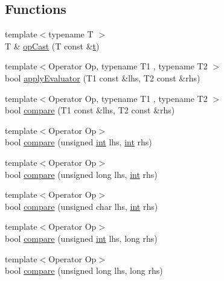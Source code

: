 \subsection*{Functions}
\begin{DoxyCompactItemize}
\item 
{\footnotesize template$<$typename T $>$ }\\T \& \hyperlink{namespace_catch_1_1_internal_adde98c1a650e94615e2b37ab0b3734e2}{op\+Cast} (T const \&\hyperlink{_s_d_l__opengl_8h_a7d65d00ca3b0630d9b5c52df855b19f5}{t})
\item 
{\footnotesize template$<$Operator Op, typename T1 , typename T2 $>$ }\\bool \hyperlink{namespace_catch_1_1_internal_a3849d993997f2b708281ff02e77dfecf}{apply\+Evaluator} (T1 const \&lhs, T2 const \&rhs)
\item 
{\footnotesize template$<$Operator Op, typename T1 , typename T2 $>$ }\\bool \hyperlink{namespace_catch_1_1_internal_a64ae04769c4583b9d4027c792b496c7d}{compare} (T1 const \&lhs, T2 const \&rhs)
\item 
{\footnotesize template$<$Operator Op$>$ }\\bool \hyperlink{namespace_catch_1_1_internal_a171aec1826898b877980a2b15fe5f735}{compare} (unsigned \hyperlink{_s_d_l__thread_8h_a6a64f9be4433e4de6e2f2f548cf3c08e}{int} lhs, \hyperlink{_s_d_l__thread_8h_a6a64f9be4433e4de6e2f2f548cf3c08e}{int} rhs)
\item 
{\footnotesize template$<$Operator Op$>$ }\\bool \hyperlink{namespace_catch_1_1_internal_aa2698c33ec87b16aff5c844165483a7a}{compare} (unsigned long lhs, \hyperlink{_s_d_l__thread_8h_a6a64f9be4433e4de6e2f2f548cf3c08e}{int} rhs)
\item 
{\footnotesize template$<$Operator Op$>$ }\\bool \hyperlink{namespace_catch_1_1_internal_ad68724393ee3d7629001a2997f6134cc}{compare} (unsigned char lhs, \hyperlink{_s_d_l__thread_8h_a6a64f9be4433e4de6e2f2f548cf3c08e}{int} rhs)
\item 
{\footnotesize template$<$Operator Op$>$ }\\bool \hyperlink{namespace_catch_1_1_internal_ac2af7b6757f9bb3539bb78acff5c4649}{compare} (unsigned \hyperlink{_s_d_l__thread_8h_a6a64f9be4433e4de6e2f2f548cf3c08e}{int} lhs, long rhs)
\item 
{\footnotesize template$<$Operator Op$>$ }\\bool \hyperlink{namespace_catch_1_1_internal_ace20062a489a8a7049fe224d62e644a7}{compare} (unsigned long lhs, long rhs)

\end{DoxyCompactItemize}
